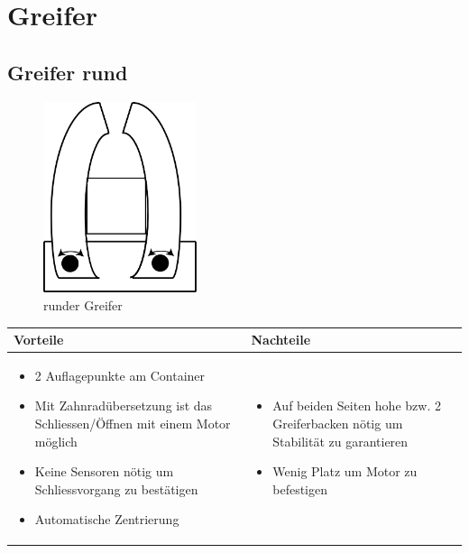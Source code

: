 
\section{Greifer}


\subsection{Greifer rund}
\begin{figure} [hbp]
	\centering
	\includegraphics[width=0.4\textwidth]{fig/Greifer_rund.png}
	\caption{runder Greifer}
\end{figure}


\begin{table}[h]
\begin{tabular}{p{} | p{}}


 \textbf{Vorteile} & \textbf{Nachteile} \\ \hline
	 
\begin{itemize}
\item 2 Auflagepunkte am Container
\item Mit Zahnradübersetzung ist das Schliessen/Öffnen mit einem Motor möglich
\item Keine Sensoren nötig um Schliessvorgang zu bestätigen
\item Automatische Zentrierung
\end{itemize}

 
 &
 
\begin{itemize}
\item Auf beiden Seiten hohe bzw. 2 Greiferbacken nötig um Stabilität zu garantieren
\item Wenig Platz um Motor zu befestigen
\end{itemize}

\end{tabular}
\end{table}

